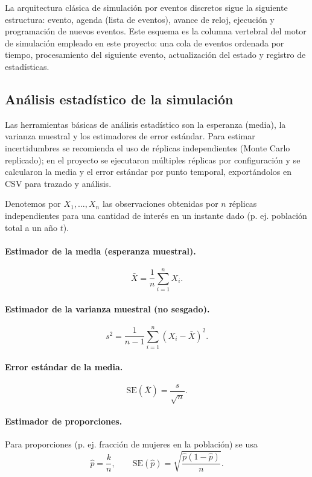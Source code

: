 \documentclass[12pt, a4paper, spanish]{report}
\begin{document}
La arquitectura clásica de simulación por eventos discretos sigue la siguiente estructura:
evento, agenda (lista de eventos), avance de reloj, ejecución y programación
de nuevos eventos. Este esquema es la columna vertebral del motor de simulación
empleado en este proyecto: una cola de eventos ordenada por tiempo, procesamiento
del siguiente evento, actualización del estado y registro de estadísticas.

\subsection{Análisis estadístico de la simulación}

Las herramientas básicas de análisis estadístico son la esperanza (media), la
varianza muestral y los estimadores de error estándar. Para estimar incertidumbres se
recomienda el uso de réplicas independientes (Monte Carlo replicado); en el
proyecto se ejecutaron múltiples réplicas por configuración y se calcularon la
media y el error estándar por punto temporal, exportándolos en CSV para trazado
y análisis.

Denotemos por $X_1,\dots,X_n$ las observaciones obtenidas por $n$ réplicas independientes para una cantidad de interés en un instante dado (p. ej. población total a un año $t$).

\paragraph{Estimador de la media (esperanza muestral).}
$$
\bar{X}=\frac{1}{n}\sum_{i=1}^n X_i.
$$

\paragraph{Estimador de la varianza muestral (no sesgado).}
$$
s^2=\frac{1}{n-1}\sum_{i=1}^n (X_i-\bar{X})^2.
$$

\paragraph{Error estándar de la media.}
$$
\mathrm{SE}(\bar{X})=\frac{s}{\sqrt{n}}.
$$

\paragraph{Estimador de proporciones.}
Para proporciones (p. ej. fracción de mujeres en la población) se usa
$$
\hat{p}=\frac{k}{n},\qquad \mathrm{SE}(\hat{p})=\sqrt{\frac{\hat{p}(1-\hat{p})}{n}}.
$$
\end{document}
